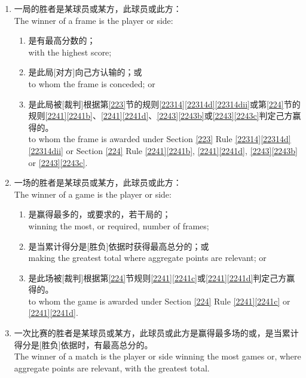 \begin{enumerate}[label=(\alph*)]
    \item 一局的胜者是某球员或某方，此球员或此方：\\
    The winner of a frame is the player or side:
    \begin{enumerate}[label=(\roman*)]
        \item 是有最高分数的；\\
        with the highest score;
        \item 是此局[对方]向己方认输的；或\\
        to whom the frame is conceded; or
        \item 是此局被[裁判]根据第\ref{223}节的规则\ref{22314}\ref{22314d}\ref{22314dii}或第\ref{224}节的规则\ref{2241}\ref{2241b}、\ref{2241}\ref{2241d}、\ref{2243}\ref{2243b}或\ref{2243}\ref{2243c}判定己方赢得的。\\
        to whom the frame is awarded under Section \ref{223} Rule \ref{22314}\ref{22314d}\ref{22314dii} or Section \ref{224} Rule \ref{2241}\ref{2241b}, \ref{2241}\ref{2241d}, \ref{2243}\ref{2243b} or \ref{2243}\ref{2243c}.
    \end{enumerate}
    \item 一场的胜者是某球员或某方，此球员或此方：\\
    The winner of a game is the player or side:
    \begin{enumerate}[label=(\roman*)]
        \item 是赢得最多的，或要求的，若干局的；\\
        winning the most, or required, number of frames;
        \item 是当累计得分是[胜负]依据时获得最高总分的；或\\
        making the greatest total where aggregate points are relevant; or
        \item 是此场被[裁判]根据第\ref{224}节规则\ref{2241}\ref{2241c}或\ref{2241}\ref{2241d}判定己方赢得的。\\
        to whom the game is awarded under Section \ref{224} Rule \ref{2241}\ref{2241c} or \ref{2241}\ref{2241d}.
    \end{enumerate}
    \item \label{2231h}一次比赛的胜者是某球员或某方，此球员或此方是赢得最多场的或，是当累计得分是[胜负]依据时，有最高总分的。\\
    The winner of a match is the player or side winning the most games or, where aggregate points are relevant, with the greatest total.
\end{enumerate}

